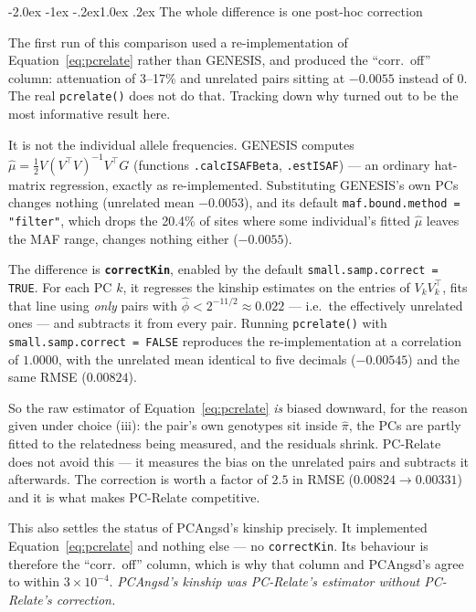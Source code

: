 \documentclass[10pt,a4paper]{article}
\makeatletter
\renewcommand\subsection{\@startsection{subsection}{2}{\z@}%
  {-2.0ex \@plus -1ex \@minus -.2ex}{1.0ex \@plus.2ex}%
  {\normalfont\normalsize\bfseries\color{hdr}}}
\makeatother
\begin{document}
\subsection{The whole difference is one post-hoc correction}

The first run of this comparison used a re-implementation of Equation~\eqref{eq:pcrelate} rather than
GENESIS, and produced the ``corr.\ off'' column: attenuation of 3--17\% and unrelated pairs sitting at
$-0.0055$ instead of $0$. The real \texttt{pcrelate()} does not do that. Tracking down why turned out to be
the most informative result here.

It is not the individual allele frequencies. GENESIS computes $\hat\mu = \tfrac12 V(V^{\!\top}V)^{-1}V^{\!\top}G$
(functions \texttt{.calcISAFBeta}, \texttt{.estISAF}) --- an ordinary hat-matrix regression, exactly as
re-implemented. Substituting GENESIS's own PCs changes nothing (unrelated mean $-0.0053$), and its default
\texttt{maf.bound.method = "filter"}, which drops the 20.4\% of sites where some individual's fitted
$\hat\mu$ leaves the MAF range, changes nothing either ($-0.0055$).

The difference is \textbf{\texttt{correctKin}}, enabled by the default \texttt{small.samp.correct = TRUE}.
For each PC $k$, it regresses the kinship estimates on the entries of $V_kV_k^{\!\top}$, fits that line using
\emph{only} pairs with $\hat\phi<2^{-11/2}\approx0.022$ --- i.e.\ the effectively unrelated ones --- and
subtracts it from every pair. Running \texttt{pcrelate()} with \texttt{small.samp.correct = FALSE} reproduces
the re-implementation at a correlation of $\mathbf{1.0000}$, with the unrelated mean identical to five
decimals ($-0.00545$) and the same RMSE ($0.00824$).

So the raw estimator of Equation~\eqref{eq:pcrelate} \emph{is} biased downward, for the reason given under
choice (iii): the pair's own genotypes sit inside $\hat\pi$, the PCs are partly fitted to the relatedness
being measured, and the residuals shrink. PC-Relate does not avoid this --- it measures the bias on the
unrelated pairs and subtracts it afterwards. The correction is worth a factor of $2.5$ in RMSE
($0.00824 \to 0.00331$) and it is what makes PC-Relate competitive.

This also settles the status of PCAngsd's kinship precisely. It implemented
Equation~\eqref{eq:pcrelate} and nothing else --- no \texttt{correctKin}. Its behaviour is therefore the
``corr.\ off'' column, which is why that column and PCAngsd's agree to within $3\times10^{-4}$.
\emph{PCAngsd's kinship was PC-Relate's estimator without PC-Relate's correction.}
\end{document}
